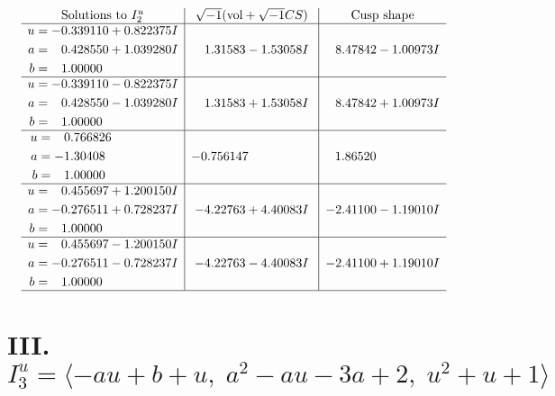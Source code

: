 \documentclass[1p]{elsarticle_modified}
\theoremstyle{definition}
\newcommand{\I}{\sqrt{-1}}
\begin{document}
$$\begin{array}{c|c|c}  
\text{Solutions to }I^u_{2}& \I (\text{vol} + \sqrt{-1}CS) & \text{Cusp shape}\\
 \hline 
\begin{aligned}
u &= -0.339110 + 0.822375 I \\
a &= \phantom{-}0.428550 + 1.039280 I \\
b &= \phantom{-}1.00000\phantom{ +0.000000I}\end{aligned}
 & \phantom{-}1.31583 - 1.53058 I & \phantom{-}8.47842 - 1.00973 I \\ \hline\begin{aligned}
u &= -0.339110 - 0.822375 I \\
a &= \phantom{-}0.428550 - 1.039280 I \\
b &= \phantom{-}1.00000\phantom{ +0.000000I}\end{aligned}
 & \phantom{-}1.31583 + 1.53058 I & \phantom{-}8.47842 + 1.00973 I \\ \hline\begin{aligned}
u &= \phantom{-}0.766826\phantom{ +0.000000I} \\
a &= -1.30408\phantom{ +0.000000I} \\
b &= \phantom{-}1.00000\phantom{ +0.000000I}\end{aligned}
 & -0.756147\phantom{ +0.000000I} & \phantom{-}1.86520\phantom{ +0.000000I} \\ \hline\begin{aligned}
u &= \phantom{-}0.455697 + 1.200150 I \\
a &= -0.276511 + 0.728237 I \\
b &= \phantom{-}1.00000\phantom{ +0.000000I}\end{aligned}
 & -4.22763 + 4.40083 I & -2.41100 - 1.19010 I \\ \hline\begin{aligned}
u &= \phantom{-}0.455697 - 1.200150 I \\
a &= -0.276511 - 0.728237 I \\
b &= \phantom{-}1.00000\phantom{ +0.000000I}\end{aligned}
 & -4.22763 - 4.40083 I & -2.41100 + 1.19010 I\\
 \hline 
 \end{array}$$\newpage\newpage\renewcommand{\arraystretch}{1}
\centering \section*{III. $I^u_{3}= \langle - a u+b+u,\;a^2- a u-3 a+2,\;u^2+u+1 \rangle$}
\end{document}
